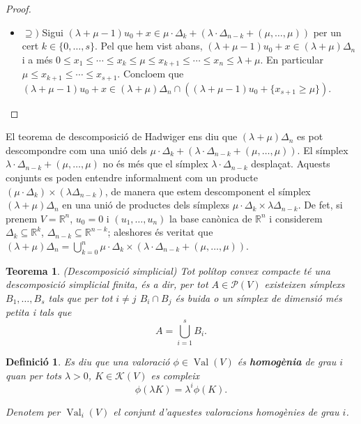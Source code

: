 \documentclass{article}
\newtheorem{teorema}{Teorema}
\newtheorem{definicio}{Definici\'{o}}
\theoremstyle{definition}
\DeclareMathOperator{\Val}{Val}
\begin{document}
\begin{proof}
\begin{itemize}
    \item $\supseteq)$ Sigui $(\lambda+\mu-1)u_0+x\in\mu\cdot\Delta_k+(\lambda\cdot\Delta_{n-k}+(\mu,\ldots,\mu))$ per un cert $k\in\{0,\ldots,s\}$. Pel que hem vist abans, $(\lambda+\mu-1)u_0+x\in(\lambda+\mu)\Delta_n$ i a m\'{e}s $0\leq x_1\leq\cdots\leq x_k\leq\mu\leq x_{k+1}\leq\cdots\leq x_n\leq\lambda+\mu$. En particular $\mu\leq x_{k+1}\leq\cdots\leq x_{s+1}$. Concloem que $(\lambda+\mu-1)u_0+x\in(\lambda+\mu)\Delta_n\cap((\lambda+\mu-1)u_0+\{x_{s+1}\geq\mu\})$.
\end{itemize}
\end{proof}

El teorema de descomposici\'{o} de Hadwiger ens diu que $(\lambda+\mu)\Delta_n$ es pot descompondre com una uni\'{o} dels $\mu\cdot\Delta_k+(\lambda\cdot\Delta_{n-k}+(\mu,\ldots,\mu))$. El s\'{i}mplex $\lambda\cdot\Delta_{n-k}+(\mu,\ldots,\mu)$ no \'{e}s m\'{e}s que el s\'{i}mplex $\lambda\cdot\Delta_{n-k}$ despla\c{c}at. Aquests conjunts es poden entendre informalment com un producte $(\mu\cdot\Delta_k)\times(\lambda\Delta_{n-k})$, de manera que estem descomponent el s\'{i}mplex $(\lambda+\mu)\Delta_n$ en una uni\'{o} de productes dels s\'{i}mplexs $\mu\cdot\Delta_k\times\lambda\Delta_{n-k}$. De fet, si prenem $V=\mathbb{R}^n$, $u_0=0$ i $(u_1,\ldots,u_n)$ la base can\`{o}nica de $\mathbb{R}^n$ i considerem $\Delta_k\subseteq\mathbb{R}^k$, $\Delta_{n-k}\subseteq\mathbb{R}^{n-k}$; aleshores \'{e}s veritat que $(\lambda+\mu)\Delta_n=\bigcup_{k=0}^n\mu\cdot\Delta_k\times(\lambda\cdot\Delta_{n-k}+(\mu,\ldots,\mu))$.

\begin{teorema}\label{Teo:descomsimplex}
(Descomposici\'{o} simplicial) Tot pol\'{i}top convex compacte t\'{e} una descomposici\'{o} simplicial finita, \'{e}s a dir, per tot $A\in\mathcal{P}(V)$ existeixen s\'{i}mplexs $B_1,\ldots,B_s$ tals que per tot $i\neq j$ $B_i\cap B_j$ \'{e}s buida o un s\'{i}mplex de dimensi\'{o} m\'{e}s petita i tals que
\[A=\bigcup_{i=1}^sB_i.\]
\end{teorema}

\begin{definicio}\label{Def:homogenia}
Es diu que una valoraci\'{o} $\phi\in\Val(V)$ \'{e}s \textbf{homog\`{e}nia} de grau $i$ quan per tots $\lambda>0$, $K\in\mathcal{K}(V)$ es compleix
\[\phi(\lambda K)=\lambda^i\phi(K).\]

Denotem per $\Val_i(V)$ el conjunt d'aquestes valoracions homog\`{e}nies de grau $i$.
\end{definicio}
\end{document}
